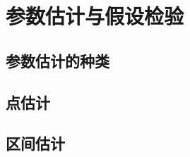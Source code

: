 \chapter{参数估计与假设检验}

\section{参数估计的种类}
\label{sec:参数估计的种类}

\section{点估计}
\label{sec:点估计}

\section{区间估计}
\label{sec:区间估计}
